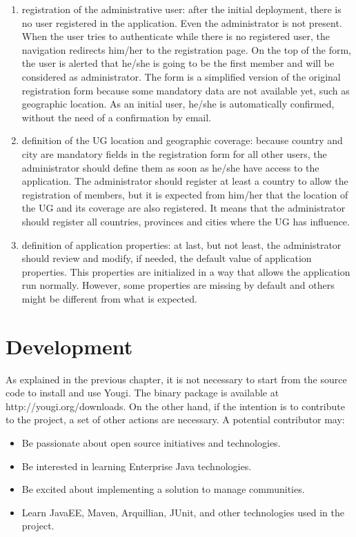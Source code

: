 \documentclass[envcountsame,envcountchap]{svmono}
\begin{document}
\begin{enumerate}
\item registration of the administrative user: after the initial deployment, there is no user registered in the application. Even the administrator is not present. When the user tries to authenticate while there is no registered user, the navigation redirects him/her to the registration page. On the top of the form, the user is alerted that he/she is going to be the first member and will be considered as administrator. The form is a simplified version of the original registration form because some mandatory data are not available yet, such as geographic location. As an initial user, he/she is automatically confirmed, without the need of a confirmation by email.
\item definition of the UG location and geographic coverage: because country and city are mandatory fields in the registration form for all other users, the administrator should define them as soon as he/she have access to the application. The administrator should register at least a country to allow the registration of members, but it is expected from him/her that the location of the UG and its coverage are also registered. It means that the administrator should register all countries, provinces and cities where the UG has influence.
\item definition of application properties: at last, but not least, the administrator should review and modify, if needed, the default value of application properties. This properties are initialized in a way that allows the application run normally. However, some properties are missing by default and others might be different from what is expected.
\end{enumerate}

\chapter{Development}

As explained in the previous chapter, it is not necessary to start from the source code to install and use Yougi. The binary package is available at http://yougi.org/downloads. On the other hand, if the intention is to contribute to the project, a set of other actions are necessary. A potential contributor may:

\begin{itemize}
\item Be passionate about open source initiatives and technologies.
\item Be interested in learning Enterprise Java technologies.
\item Be excited about implementing a solution to manage communities.
\item Learn JavaEE, Maven, Arquillian, JUnit, and other technologies used in the project.
\end{itemize}
\end{document}
